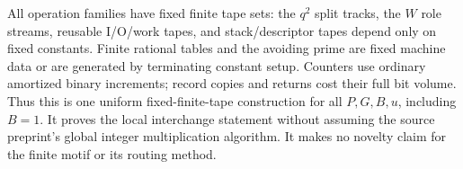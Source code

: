 All operation families have fixed finite tape sets: the $q^2$ split
tracks, the $W$ role streams, reusable I/O/work tapes, and stack/descriptor
tapes depend only on fixed constants.  Finite rational tables and the
avoiding prime are fixed machine data or are generated by terminating
constant setup.  Counters use ordinary amortized binary increments;
record copies and returns cost their full bit volume.  Thus this is one
uniform fixed-finite-tape construction for all $P,G,B,u$, including
$B=1$.  It proves the local interchange statement without assuming the
source preprint's global integer multiplication algorithm.  It makes no
novelty claim for the finite motif or its routing method.



